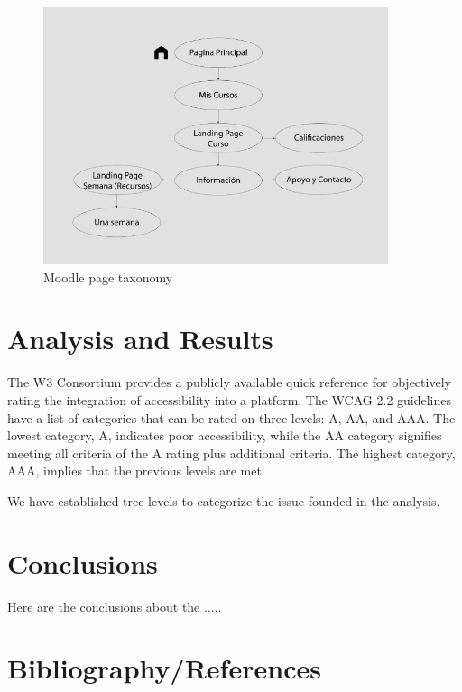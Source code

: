 \documentclass{article}
\begin{document}
\begin{figure}[h]
    \includegraphics[width=0.9\textwidth]{images/figure1.png}
    \caption{Moodle page taxonomy}
    \label{fig:figure1}
\end{figure}

\section{Analysis and Results}
The W3 Consortium provides a publicly available quick reference for objectively rating the integration of accessibility into a platform. The WCAG 2.2 guidelines have a list of categories that can be rated on three levels: A, AA, and AAA. The lowest category, A, indicates poor accessibility, while the AA category signifies meeting all criteria of the A rating plus additional criteria. The highest category, AAA, implies that the previous levels are met.

We have established tree levels to categorize the issue founded in the analysis.


\section{Conclusions}
Here are the conclusions about the .....

\section*{Bibliography/References}
\end{document}
